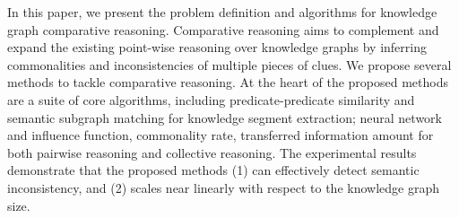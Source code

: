 


In this paper, we present the problem definition and algorithms for knowledge graph comparative reasoning. 
Comparative reasoning aims to complement and expand the existing point-wise reasoning over knowledge graphs by inferring commonalities and inconsistencies of multiple pieces of clues.
We propose several methods to tackle comparative reasoning.
At the heart of the proposed methods are a suite of core algorithms, including predicate-predicate similarity and semantic subgraph matching for knowledge segment extraction; neural network and influence function, commonality rate, transferred information amount for both pairwise reasoning and collective reasoning. 
The experimental results demonstrate that the proposed methods (1) can effectively detect semantic inconsistency, and (2) scales near linearly with respect to the knowledge graph size. 

